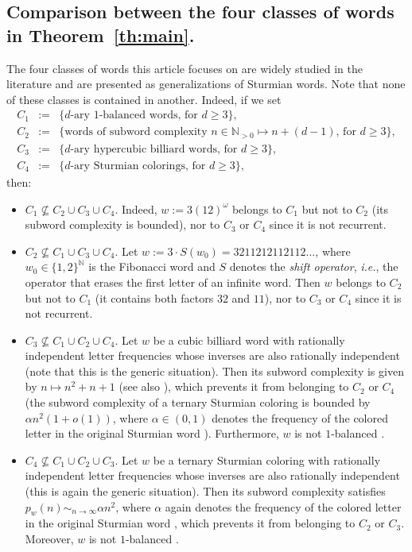 \documentclass{template_arxiv}
\theoremstyle{definition}
\newcommand{\N}{\mathbb{N}}
\begin{document}
\subsection{Comparison between the four classes of words in Theorem~\ref{th:main}.}

The four classes of words this article focuses on are widely studied in the literature and are presented as generalizations of Sturmian words. Note that none of these classes is contained in another. Indeed, if we set
\[
	\begin{array}{lcl}
		C_1 &:=& \{\text{$d$-ary $1$-balanced words, for $d\geq 3$}\},\\
		C_2 &:=& \{\text{words of subword complexity $n\in\N_{>0}\mapsto n+(d-1)$, for $d\geq 3$}\},\\
		C_3 &:=& \{\text{$d$-ary hypercubic billiard words, for $d\geq 3$}\},\\
		C_4 &:=& \{\text{$d$-ary Sturmian colorings, for $d\geq 3$}\},
	\end{array}
\]
then:
\begin{itemize}
	\item[-] $C_1\nsubseteq C_2\cup C_3\cup C_4$. Indeed, $w:=3(12)^\omega$ belongs to $C_1$ but not to $C_2$ (its subword complexity is bounded), nor to $C_3$ or $C_4$ since it is not recurrent.
	\item[-] $C_2\nsubseteq C_1\cup C_3\cup C_4$. Let $w:=3\cdot S(w_0)=3 21 12 121 121 12\ldots$, where $w_0\in\{1,2\}^\N$ is the Fibonacci word and $S$ denotes the \emph{shift operator}, \emph{i.e.}, the operator that erases the first letter of an infinite word. Then $w$ belongs to $C_2$ but not to $C_1$ (it contains both factors $32$ and $11$), nor to $C_3$ or $C_4$ since it is not recurrent.
	\item[-] $C_3\nsubseteq C_1\cup C_2\cup C_4$. Let $w$ be a cubic billiard word with rationally independent letter frequencies whose inverses are also rationally independent (note that this is the generic situation). Then its subword complexity is given by $n\mapsto n^2+n+1$ \cite{Bar95} (see also \cite[Theorem~6]{Bed03}), which prevents it from belonging to $C_2$ or $C_4$ (the subword complexity of a ternary Sturmian coloring is bounded by $\alpha n^2(1+o(1))$, where $\alpha\in(0,1)$ denotes the frequency of the colored letter in the original Sturmian word \cite[Theorem~9 and Remark~10]{DMP24}). Furthermore, $w$ is not $1$-balanced \cite[Theorem~2]{AV22}. 
	\item[-] $C_4\nsubseteq C_1\cup C_2\cup C_3$. Let $w$ be a ternary Sturmian coloring with rationally independent letter frequencies whose inverses are also rationally independent (this is again the generic situation). Then its subword complexity satisfies $p_w(n)\sim_{n\to\infty}\alpha n^2$, where $\alpha$ again denotes the frequency of the colored letter in the original Sturmian word \cite[Theorem~16 and Remark~10]{DMP24}, which prevents it from belonging to $C_2$ or $C_3$. Moreover, $w$ is not $1$-balanced \cite[Theorem~9]{DMP24}.
\end{itemize}
\end{document}
